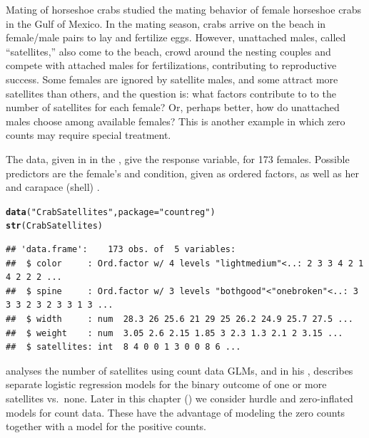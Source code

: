 \documentclass[11pt]{book}\usepackage[]{graphicx}\usepackage[]{color}
\makeatletter
\newcommand{\hlstr}[1]{\textcolor[rgb]{0.192,0.494,0.8}{#1}}%
\newcommand{\hlstd}[1]{\textcolor[rgb]{0.345,0.345,0.345}{#1}}%
\newcommand{\hlkwc}[1]{\textcolor[rgb]{0.333,0.667,0.333}{#1}}%
\newcommand{\hlkwd}[1]{\textcolor[rgb]{0.737,0.353,0.396}{\textbf{#1}}}%
\newenvironment{kframe}{%
 \def\at@end@of@kframe{}%
 \ifinner\ifhmode%
  \def\at@end@of@kframe{\end{minipage}}%
  \begin{minipage}{\columnwidth}%
 \fi\fi%
 \def\FrameCommand##1{\hskip\@totalleftmargin \hskip-\fboxsep
 \colorbox{shadecolor}{##1}\hskip-\fboxsep
     \hskip-\linewidth \hskip-\@totalleftmargin \hskip\columnwidth}%
 \MakeFramed {\advance\hsize-\width
   \@totalleftmargin\z@ \linewidth\hsize
   \@setminipage}}%
 {\par\unskip\endMakeFramed%
 \at@end@of@kframe}
\newenvironment{knitrout}{}{} %
\renewenvironment{knitrout}{\small\renewcommand{\baselinestretch}{.85}}{} %
\makeatother
\begin{document}
\begin{Example}[crabs1]{Mating of horseshoe crabs}
\citet{Brockmann:1996} studied the mating behavior of female horseshoe crabs in the Gulf of Mexico.
In the mating season, crabs arrive on the beach in female/male pairs to lay and fertilize eggs.
However, unattached males, called ``satellites,''
also come to the beach, crowd around the nesting couples and compete with attached males for fertilizations,
contributing to reproductive success.
Some females are ignored by satellite males, and some attract
more satellites than others, and the question is: what factors contribute to
to the number of satellites for each female? Or, perhaps better, how do unattached males choose among
available females?
This is another example in which zero counts
may require special treatment.

The data, given in  in the , give the
response variable,  for 173 females.  Possible predictors
are the female's  and  condition, given as ordered factors,
as well as her  and carapace (shell) .

\begin{knitrout}\footnotesize
{}\color{fgcolor}\begin{kframe}
\begin{alltt}
\hlkwd{data}\hlstd{(}\hlstr{"CrabSatellites"}\hlstd{,} \hlkwc{package} \hlstd{=} \hlstr{"countreg"}\hlstd{)}
\hlkwd{str}\hlstd{(CrabSatellites)}
\end{alltt}
\begin{verbatim}
## 'data.frame':	173 obs. of  5 variables:
##  $ color     : Ord.factor w/ 4 levels "lightmedium"<..: 2 3 3 4 2 1 4 2 2 2 ...
##  $ spine     : Ord.factor w/ 3 levels "bothgood"<"onebroken"<..: 3 3 3 2 3 2 3 3 1 3 ...
##  $ width     : num  28.3 26 25.6 21 29 25 26.2 24.9 25.7 27.5 ...
##  $ weight    : num  3.05 2.6 2.15 1.85 3 2.3 1.3 2.1 2 3.15 ...
##  $ satellites: int  8 4 0 0 1 3 0 0 8 6 ...
\end{verbatim}
\end{kframe}
\end{knitrout}

\citet[\S 4.3]{Agresti:2013} analyses the number of satellites using count data
GLMs, and in his , describes separate logistic regression models for the binary
outcome of one or more satellites vs.\ none.  Later in this chapter ()
we consider
hurdle and zero-inflated models for count data.  These have the advantage of
modeling the zero counts together with a model for the positive counts.


\end{Example}
\end{document}

